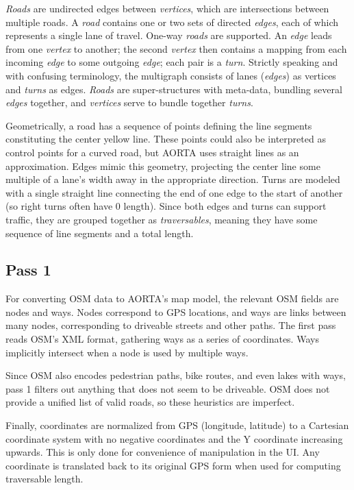 \documentclass[letterpaper, 10 pt, conference]{ieeeconf}  %
\begin{document}
\emph{Roads} are undirected edges between \emph{vertices}, which are
intersections between multiple roads. A \emph{road} contains one or two sets of
directed \emph{edges}, each of which represents a single lane of travel. One-way
\emph{roads} are supported. An \emph{edge} leads from one \emph{vertex} to
another; the second \emph{vertex} then contains a mapping from each incoming
\emph{edge} to some outgoing \emph{edge}; each pair is a \emph{turn}. Strictly
speaking and with confusing terminology, the multigraph consists of lanes
(\emph{edges}) as vertices and \emph{turns} as edges. \emph{Roads} are
super-structures with meta-data, bundling several \emph{edges} together, and
\emph{vertices} serve to bundle together \emph{turns}.

Geometrically, a road has a sequence of points defining the line segments
constituting the center yellow line. These points could also be interpreted as
control points for a curved road, but AORTA uses straight lines as an approximation.
Edges mimic this geometry, projecting the center line some multiple of a lane's
width away in the appropriate direction. Turns are modeled with a single
straight line connecting the end of one edge to the start of another (so right
turns often have $0$ length). Since both edges and turns can support traffic,
they are grouped together as \emph{traversables}, meaning they have some
sequence of line segments and a total length.

\subsection{Pass 1}

For converting OSM data to AORTA's map model, the relevant OSM fields
are nodes and ways. Nodes correspond to  GPS locations, and
ways are links between many nodes, corresponding to driveable streets
and other paths. The first pass reads OSM's XML format, gathering ways
as a series of coordinates. Ways implicitly intersect when a node is
used by multiple ways.

Since OSM also encodes pedestrian paths, bike routes, and even lakes with ways,
pass 1 filters out anything that does not seem to be driveable. OSM does not
provide a unified list of valid roads, so these heuristics are
imperfect.

Finally, coordinates are normalized from GPS (longitude, latitude) to a
Cartesian coordinate system with no negative coordinates and the Y coordinate
increasing upwards. This is only done for convenience of manipulation in the UI.
Any coordinate is translated back to its original GPS form when used for
computing traversable length.
\end{document}
